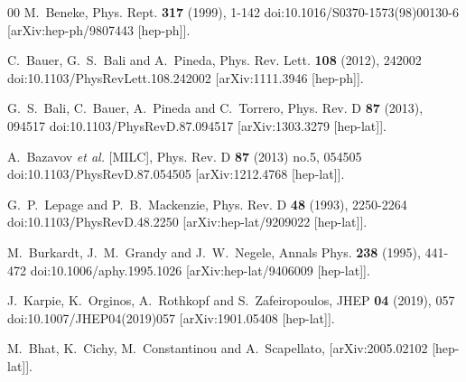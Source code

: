\documentclass[preprint,12pt]{elsarticle}
\begin{document}
\begin{thebibliography}{00}
M.~Beneke,
Phys. Rept. \textbf{317} (1999), 1-142
doi:10.1016/S0370-1573(98)00130-6
[arXiv:hep-ph/9807443 [hep-ph]].

C.~Bauer, G.~S.~Bali and A.~Pineda,
Phys. Rev. Lett. \textbf{108} (2012), 242002
doi:10.1103/PhysRevLett.108.242002
[arXiv:1111.3946 [hep-ph]].

G.~S.~Bali, C.~Bauer, A.~Pineda and C.~Torrero,
Phys. Rev. D \textbf{87} (2013), 094517
doi:10.1103/PhysRevD.87.094517
[arXiv:1303.3279 [hep-lat]].

A.~Bazavov \textit{et al.} [MILC],
Phys. Rev. D \textbf{87} (2013) no.5, 054505
doi:10.1103/PhysRevD.87.054505
[arXiv:1212.4768 [hep-lat]].

G.~P.~Lepage and P.~B.~Mackenzie,
Phys. Rev. D \textbf{48} (1993), 2250-2264
doi:10.1103/PhysRevD.48.2250
[arXiv:hep-lat/9209022 [hep-lat]].

M.~Burkardt, J.~M.~Grandy and J.~W.~Negele,
Annals Phys. \textbf{238} (1995), 441-472
doi:10.1006/aphy.1995.1026
[arXiv:hep-lat/9406009 [hep-lat]].

J.~Karpie, K.~Orginos, A.~Rothkopf and S.~Zafeiropoulos,
JHEP \textbf{04} (2019), 057
doi:10.1007/JHEP04(2019)057
[arXiv:1901.05408 [hep-lat]].

M.~Bhat, K.~Cichy, M.~Constantinou and A.~Scapellato,
[arXiv:2005.02102 [hep-lat]].


\end{thebibliography}
\end{document}
